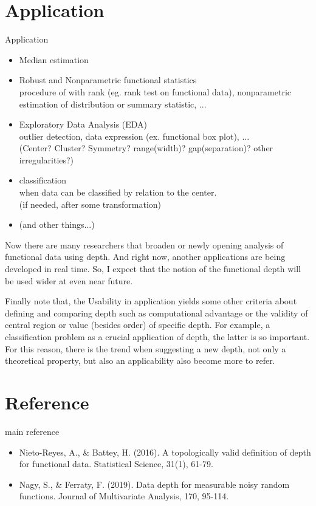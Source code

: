 \documentclass[aspectratio=169,ignorenonframetext,9pt]{beamer}
\theoremstyle{plain}
\theoremstyle{definition}
\begin{document}
\section{Application}
\begin{frame}{Application}
\begin{itemize}
    \item Median estimation
    \item Robust and Nonparametric functional statistics \\
    procedure of with rank (eg. rank test on functional data), nonparametric estimation of distribution or summary statistic, ...
    \item Exploratory Data Analysis (EDA) \\
    outlier detection, data expression (ex. functional box plot), ...\\
    (Center? Cluster? Symmetry? range(width)? gap(separation)? other irregularities?)
    \item classification \\
    when data can be classified by relation to the center. \\
    (if needed, after some transformation)
    \item (and other things...)
\end{itemize}

Now there are many researchers that broaden or newly opening analysis of functional data using depth.
And right now, another applications are being developed in real time.
So, I expect that the notion of the functional depth will be used wider at even near future.

Finally note that, the Usability in application yields some other criteria about defining and comparing depth
such as computational advantage or the validity of central region or value (besides order) of specific depth.
For example, a classification problem as a crucial application of depth, the latter is so important.
For this reason, there is the trend when suggesting a new depth, not only a theoretical property, 
but also an applicability also become more to refer.

\end{frame}

\section{Reference}
\begin{frame}{main reference}
    \begin{itemize}
        \item Nieto-Reyes, A., \& Battey, H. (2016). A topologically valid definition of depth for functional data. Statistical Science, 31(1), 61-79.
        \item Nagy, S., \& Ferraty, F. (2019). Data depth for measurable noisy random functions. Journal of Multivariate Analysis, 170, 95-114.
    \end{itemize}
\end{frame}
\end{document}
